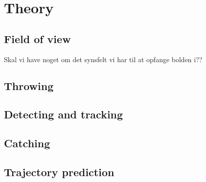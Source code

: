 \chapter{Theory}
\label{chap:Theory}

\section{Field of view}
\label{sec:Field of view}
Skal vi have noget om det synsfelt vi har til at opfange bolden i??

\section{Throwing}
\label{sec:ThrowingTheory}

\section{Detecting and tracking}
\label{sec:Detecting and trackingTheory}

\section{Catching}
\label{sec:catchingTheory}

\section{Trajectory prediction}
\label{sec:Trajectory prediction}